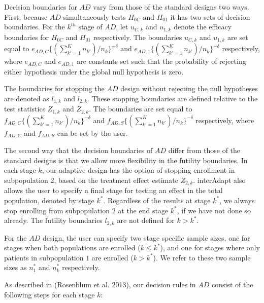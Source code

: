 \documentclass{article}
\newcommand{\interAdapt}{\textsf{interAdapt }}
\begin{document}
Decision boundaries for $AD$ vary from those of the standard designs two ways. First, because $AD$ simultaneously tests $H_{0C}$ and $H_{01}$ it has two sets of decision boundaries. For the $k^{th}$ stage of $AD$, let $u_{C,k}$ and $u_{1,k}$ denote the efficacy boundaries for $H_{0C}$ and $H_{01}$ respectively. The boundaries $u_{C,k}$ and $u_{1,k}$ are set equal to $e_{AD,C}\{(\sum_{k'=1}^{K} n_{k'})/n_k\}^{-δ}$ and $e_{AD,1}\{(\sum_{k'=1}^{K} n_{k'})/n_k\}^{-δ}$ respectively, where $e_{AD,C}$  and $e_{AD,1}$ are constants set such that the probability of rejecting either hypothesis under the global null hypothesis is zero. 

The boundaries for stopping the $AD$ design without rejecting the null hypotheses are denoted as $l_{1,k}$ and $l_{2,k}$. These stopping boundaries are defined relative to the test statistics $Z_{1,k}$ and $Z_{2,k}$. The boundaries are set equal to $f_{AD,C}\{(\sum_{k'=1}^{K} n_{k'})/n_k\}^{-δ}$ and $f_{AD,S}\{(\sum_{k'=1}^{K} n_{k'})/n_k\}^{-δ}$ respectively, where $f_{AD,C}$ and $f_{AD,S}$ can be set by the user.

The second way that the decision boundaries of $AD$ differ from those of the standard designs is that we allow more flexibility in the futility boundaries. In each stage $k$, our adaptive design has the option of stopping enrollment in subpopulation 2, based on the treatment effect estimate $Z_{2,k}$. \interAdapt also allows the user to specify a final stage for testing an effect in the total population, denoted by stage $k^*$. Regardless of the results at stage $k^*$, we always stop enrolling from subpopulation $2$ at the end stage $k^*$, if we have not done so already. The futility boundaries $l_{2,k}$ are not defined for $k>k^*$.


For the $AD$ design, the user can specify two stage specific sample sizes, one for stages when both populations are enrolled ($k≤k^*$), and one for stages where only patients in subpopulation $1$ are enrolled ($k>k^*$). We refer to these two sample sizes as $n_1^*$ and $n_k^*$ respectively.

As described in (Rosenblum et al. 2013)\cite{Rosenblum2013AdaptMISTIE}, our decision rules in $AD$ consist of the following steps for each stage $k$:
\end{document}
